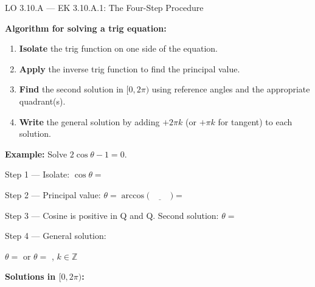 \documentclass[10pt]{article}
\begin{document}
\vspace{0.06in}

\begin{notesbox}{LO 3.10.A --- EK 3.10.A.1: The Four-Step Procedure}

\textbf{Algorithm for solving a trig equation:}
\begin{enumerate}[leftmargin=1.5em, itemsep=4pt]
  \item \textbf{Isolate} the trig function on one side of the equation.
  \item \textbf{Apply} the inverse trig function to find the principal value.
  \item \textbf{Find} the second solution in $[0, 2\pi)$ using reference angles
    and the appropriate quadrant(s).
  \item \textbf{Write} the general solution by adding $+2\pi k$ (or $+\pi k$
    for tangent) to each solution.
\end{enumerate}

\vspace{6pt}
\textbf{Example:} Solve $2\cos\theta - 1 = 0$.

\vspace{4pt}
Step 1 --- Isolate: $\cos\theta = $ \underline{\hspace{2.5cm}}

\vspace{4pt}
Step 2 --- Principal value: $\theta = \arccos\!\bigl(\underline{\hspace{1cm}}\bigr) = $ \underline{\hspace{2cm}}

\vspace{4pt}
Step 3 --- Cosine is positive in Q\underline{\hspace{0.5cm}} and Q\underline{\hspace{0.5cm}}.
Second solution: $\theta = $ \underline{\hspace{3cm}}

\vspace{4pt}
Step 4 --- General solution:

$\theta = $ \underline{\hspace{3.5cm}} or $\theta = $ \underline{\hspace{3.5cm}},
$k \in \mathbb{Z}$

\vspace{6pt}
\textbf{Solutions in $[0, 2\pi)$:}
\writeline

\end{notesbox}
\end{document}
